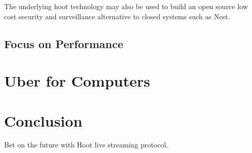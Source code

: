 \documentclass{article}
\begin{document}
The underlying hoot technology may also be used to build an open
source low cost security and surveillance alternative to closed systems
such as Nest.

\subsection{Focus on Performance}

\section{Uber for Computers}


\section{Conclusion}
Bet on the future with Hoot live streaming protocol.




\newpage
\listoffigures
\newpage 
\listoftables
\newpage 

\end{document}

